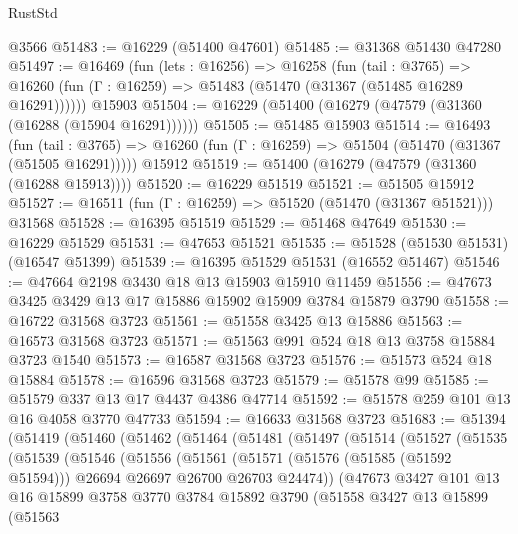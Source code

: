 \begin{lexlean}{RustStd}
\begin{coremodule}
    @3566
@51483 := @16229 (@51400 @47601)
@51485 := @31368 @51430 @47280
@51497 := @16469
    (fun (lets : @16256) =>
    @16258
      (fun (tail : @3765) =>
      @16260 (fun (Γ : @16259) => @51483 (@51470 (@31367 (@51485 @16289 @16291))))))
    @15903
@51504 := @16229 (@51400 (@16279 (@47579 (@31360 (@16288 (@15904 @16291))))))
@51505 := @51485 @15903
@51514 := @16493
    (fun (tail : @3765) => @16260 (fun (Γ : @16259) => @51504 (@51470 (@31367 (@51505 @16291)))))
    @15912
@51519 := @51400 (@16279 (@47579 (@31360 (@16288 @15913))))
@51520 := @16229 @51519
@51521 := @51505 @15912
@51527 := @16511 (fun (Γ : @16259) => @51520 (@51470 (@31367 @51521))) @31568
@51528 := @16395 @51519
@51529 := @51468 @47649
@51530 := @16229 @51529
@51531 := @47653 @51521
@51535 := @51528 (@51530 @51531) (@16547 @51399)
@51539 := @16395 @51529 @51531 (@16552 @51467)
@51546 := @47664 @2198 @3430 @18 @13 @15903 @15910 @11459
@51556 := @47673 @3425 @3429 @13 @17 @15886 @15902 @15909 @3784 @15879 @3790
@51558 := @16722 @31568 @3723
@51561 := @51558 @3425 @13 @15886
@51563 := @16573 @31568 @3723
@51571 := @51563 @991 @524 @18 @13 @3758 @15884 @3723 @1540
@51573 := @16587 @31568 @3723
@51576 := @51573 @524 @18 @15884
@51578 := @16596 @31568 @3723
@51579 := @51578 @99
@51585 := @51579 @337 @13 @17 @4437 @4386 @47714
@51592 := @51578 @259 @101 @13 @16 @4058 @3770 @47733
@51594 := @16633 @31568 @3723
@51683 := @51394
    (@51419
      (@51460
        (@51462
          (@51464
            (@51481
              (@51497
                (@51514
                  (@51527
                    (@51535
                      (@51539
                        (@51546
                          (@51556
                            (@51561
                              (@51571
                                (@51576 (@51585 (@51592 @51594)))
                                @26694
                                @26697
                                @26700
                                @26703
                                @24474))
                            (@47673
                              @3427
                              @101
                              @13
                              @16
                              @15899
                              @3758
                              @3770
                              @3784
                              @15892
                              @3790
                              (@51558
                                @3427
                                @13
                                @15899
                                (@51563

\end{coremodule}
\end{lexlean}

